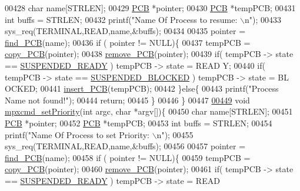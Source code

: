 \begin{DoxyCode}
00428         \textcolor{keywordtype}{char} name[STRLEN];
00429         \hyperlink{structprocess}{PCB} *pointer;
00430         \hyperlink{structprocess}{PCB} *tempPCB;
00431         \textcolor{keywordtype}{int} buffs = STRLEN;
00432         printf(\textcolor{stringliteral}{"Name Of Process to resume: \(\backslash\)n"});
00433         sys\_req(TERMINAL,READ,name,&buffs);
00434         
00435         pointer = \hyperlink{mpx__r2_8c_a612a6abcb66c688a32f33abc93ff3990}{find_PCB}(name);
00436         \textcolor{keywordflow}{if} ( pointer != NULL)\{
00437                 tempPCB = \hyperlink{mpx__r2_8c_aca3ad02d2b4c68f7653b0adf2c484ff6}{copy_PCB}(pointer);
00438                 \hyperlink{mpx__r2_8c_af30a3658210d449b4b53e5be2ed2bc2e}{remove_PCB}(pointer);
00439                 \textcolor{keywordflow}{if}( tempPCB -> state == \hyperlink{mpx__r2_8h_a07b1141143e8825b04670da23fca8cc7}{SUSPENDED_READY} ) tempPCB -> state = READ
      Y;
00440                 \textcolor{keywordflow}{if}( tempPCB -> state == \hyperlink{mpx__r2_8h_a6e41bb5a80c5049e8d364bab8ee4d73a}{SUSPENDED_BLOCKED} ) tempPCB -> state = BL
      OCKED;
00441                 \hyperlink{mpx__r2_8c_aa3b334e3a5afd6e590917667ad359a6f}{insert_PCB}(tempPCB);
00442         \}\textcolor{keywordflow}{else}\{
00443                 printf(\textcolor{stringliteral}{"Process Name not found!"});
00444                 \textcolor{keywordflow}{return};
00445         \}
00446 \}
00447 
\hypertarget{mpx__r2_8c_source_l00449}{}\hyperlink{mpx__r2_8h_a4505a685b9ab69940541dc4e973e0f01}{00449} \textcolor{keywordtype}{void} \hyperlink{mpx__r2_8c_a4505a685b9ab69940541dc4e973e0f01}{mpxcmd_setPriority}(\textcolor{keywordtype}{int} argc, \textcolor{keywordtype}{char} *argv[])\{
00450         \textcolor{keywordtype}{char} name[STRLEN];
00451         \hyperlink{structprocess}{PCB} *pointer;
00452         \hyperlink{structprocess}{PCB} *tempPCB;
00453         \textcolor{keywordtype}{int} buffs = STRLEN;
00454         printf(\textcolor{stringliteral}{"Name Of Process to set Priority: \(\backslash\)n"});
00455         sys\_req(TERMINAL,READ,name,&buffs);
00456         
00457         pointer = \hyperlink{mpx__r2_8c_a612a6abcb66c688a32f33abc93ff3990}{find_PCB}(name);
00458         \textcolor{keywordflow}{if} ( pointer != NULL)\{
00459                 tempPCB = \hyperlink{mpx__r2_8c_aca3ad02d2b4c68f7653b0adf2c484ff6}{copy_PCB}(pointer);
00460                 \hyperlink{mpx__r2_8c_af30a3658210d449b4b53e5be2ed2bc2e}{remove_PCB}(pointer);
00461                 \textcolor{keywordflow}{if}( tempPCB -> state == \hyperlink{mpx__r2_8h_a07b1141143e8825b04670da23fca8cc7}{SUSPENDED_READY} ) tempPCB -> state = READ

\end{DoxyCode}
